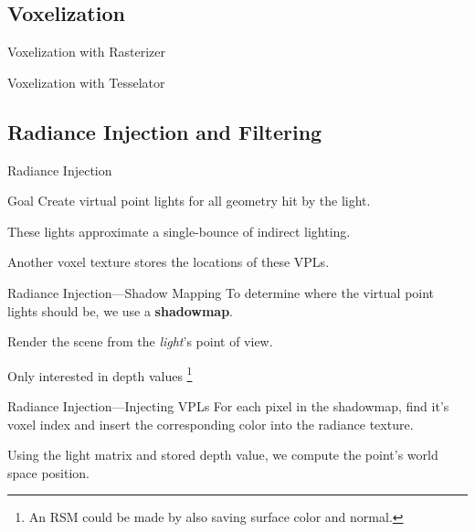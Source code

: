 \documentclass[10pt]{beamer}
\begin{document}
\subsection{Voxelization}
\begin{frame}{Voxelization with Rasterizer}
\end{frame}

\begin{frame}{Voxelization with Tesselator}
\end{frame}

\subsection{Radiance Injection and Filtering}
\begin{frame}{Radiance Injection}
  \begin{block}{Goal}
    Create virtual point lights for all geometry hit by the light.

    These lights approximate a single-bounce of indirect lighting.
  \end{block}

  Another voxel texture stores the locations of these VPLs.
\end{frame}

\begin{frame}{Radiance Injection---Shadow Mapping}
  To determine where the virtual point lights should be, we use a \textbf{shadowmap}.

  Render the scene from the \textit{light}'s point of view.

  Only interested in depth values %
  \footnote{An RSM could be made by also saving surface color and normal.}

\end{frame}

\begin{frame}{Radiance Injection---Injecting VPLs}
  For each pixel in the shadowmap, find it's voxel index and insert the corresponding color into the radiance texture.

  Using the light matrix and stored depth value, we compute the point's world space position.
\end{frame}
\end{document}
